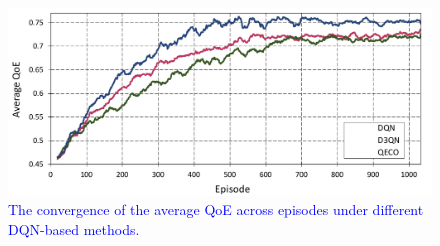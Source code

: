 \documentclass[10pt, journal,letterpaper]{IEEEtran}
\begin{document}
\begin{figure}
	\captionsetup{name=Fig.}
	\centering
	\includegraphics[width=.9\linewidth]{m1}
	\vspace*{-3mm}
	\caption{\textcolor{blue}{The convergence of the average QoE across episodes under different DQN-based methods.}}
	\vspace*{-3mm}
	\label{chart01}
\end{figure}



\vspace{-5mm}
\end{document}
